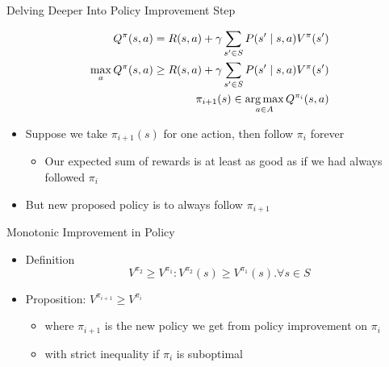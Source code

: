\documentclass[aspectratio=169]{../latex_main/tntbeamer}  %
\begin{document}
\begin{frame}[c]{Delving Deeper Into Policy Improvement Step}

\begin{eqnarray}
Q^\pi(s,a) = R(s,a) + \gamma \sum_{s' \in S} P(s' \mid s,a) V^\pi(s')\nonumber\\
\max_a Q^\pi(s,a) \geq R(s,a) + \gamma \sum_{s' \in S} P(s' \mid s,a) V^\pi(s') \nonumber\\
\pi_{i+1}(s) \in \operatorname*{arg\,max}_{a\in A} Q^{\pi_i} (s,a)\nonumber
\end{eqnarray}

\begin{itemize}
	\item Suppose we take $\pi_{i+1}(s)$ for one action, then follow $\pi_i$ forever
	\begin{itemize}
		\item Our expected sum of rewards is at least as good as if we had always
		followed $\pi_i$
	\end{itemize}
	\item But new proposed policy is to always follow $\pi_{i+1}$
\end{itemize}

\end{frame}
\begin{frame}[c]{Monotonic Improvement in Policy}

\begin{itemize}
	\item  Definition
	$$ V^{\pi_2} \geq V^{\pi_1}: V^{\pi_2}(s) \geq V^{\pi_1}(s). \forall s \in S $$
	\item Proposition: $V^{\pi_{i+1}} \geq V^{\pi_{i}}$
	\begin{itemize}
		\item where $\pi_{i+1}$ is the new policy we get from policy improvement on $\pi_i$
		\item with strict inequality if $\pi_i$ is suboptimal
	\end{itemize} 
\end{itemize}

\end{frame}
\end{document}
